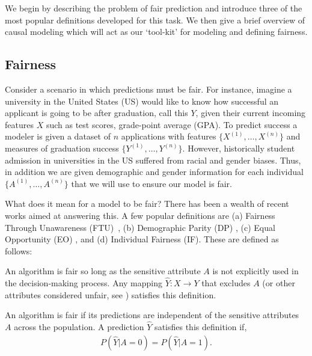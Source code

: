 We begin by describing the problem of fair prediction and introduce three of the most popular definitions developed for this task.  We then give a brief overview of causal modeling which will act as our `tool-kit' for modeling and defining fairness.

\subsection{Fairness}
Consider a scenario in which predictions must be fair. For instance, imagine a university in the United States (US) would like to know how successful an applicant is going to be after graduation, call this $Y$, given their current incoming features $X$ such as test scores, grade-point average (GPA). To predict success a modeler is given a dataset of $n$ applications with features $\{X^{(1)}, \ldots, X^{(n)} \}$ and measures of graduation success $\{Y^{(1)}, \ldots, Y^{(n)}\}$. However, historically  student admission \cite{kane1998racial,kidder2000portia} in universities in the US suffered from racial and gender biases. Thus, in addition we are given demographic and gender information for each individual $\{A^{(1)}, \ldots, A^{(n)}\}$ that we will use to ensure our model is fair.

What does it mean for a model to be fair?  There has
been a wealth of recent works aimed at answering this. A few popular
definitions are (a) Fairness Through Unawareness
(FTU)~\citep{dwork2012fairness,grgiccase}, (b) Demographic Parity (DP)
\citep{kleinberg2016inherent}, (c) Equal Opportunity (EO)
\citep{kleinberg2016inherent}, and (d) Individual Fairness (IF). These
are defined as follows:

\begin{define}
  An algorithm is fair so long as the sensitive attribute $A$ is not
  explicitly used in the decision-making process. Any mapping
  $\hat{Y}: X \rightarrow Y$ that excludes $A$ (or other attributes
  considered  unfair, see \citet{grgiccase}) satisfies this
  definition.
\end{define}

\begin{define}
An algorithm is fair if its predictions are independent of the sensitive attributes $A$ across the population. A prediction $\hat{Y}$ satisfies this definition if, 
\begin{align}
P(\hat{Y} | A = 0) = P(\hat{Y} | A = 1). \nonumber
\end{align}
\end{define}

